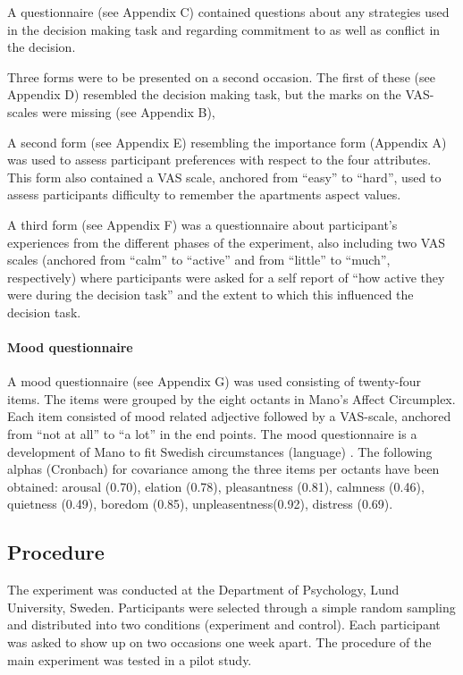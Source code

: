 \documentclass[jou,11pt]{apa6}
\begin{document}
A questionnaire (see Appendix C) contained questions about any
strategies used in the decision making task and regarding commitment
to as well as conflict in the decision.

Three forms were to be presented on a second occasion.  The first of
these (see Appendix D) resembled the decision making task, but the
marks on the VAS-scales were missing (see Appendix B),

A second form (see Appendix E) resembling the importance form
(Appendix A) was used to assess participant preferences with respect
to the four attributes.  This form also contained a VAS scale,
anchored from ``easy'' to ``hard'', used to assess participants difficulty
to remember the apartments aspect values.

A third form (see Appendix F) was a questionnaire about participant's
experiences from the different phases of the experiment, also
including two VAS scales (anchored from ``calm'' to ``active'' and from
``little'' to ``much'', respectively) where participants were asked for a
self report of ``how active they were during the decision task'' and the
extent to which this influenced the decision task.


\paragraph{Mood questionnaire} 
A mood questionnaire (see Appendix G) was used
consisting of twenty-four items.  The items were grouped by the eight
octants in Mano's Affect Circumplex.  Each item consisted of mood
related adjective followed by a VAS-scale, anchored from ``not at all''
to ``a lot'' in the end points.  The mood questionnaire is a development
of Mano \parencite{LewinsohnMano93} to fit Swedish circumstances
(language) \parencite{Salo96}.  The following alphas (Cronbach) for
covariance among the three items per octants have been obtained:
arousal (0.70), elation (0.78), pleasantness (0.81), calmness (0.46),
quietness (0.49), boredom (0.85), unpleasentness(0.92), distress
(0.69).


\subsection{Procedure}

The experiment was conducted at the Department of Psychology, Lund
University, Sweden.  Participants were selected through a simple
random sampling and distributed into two conditions (experiment and
control).  Each participant was asked to show up on two occasions one
week apart.  The procedure of the main experiment was tested in a
pilot study.
\end{document}

